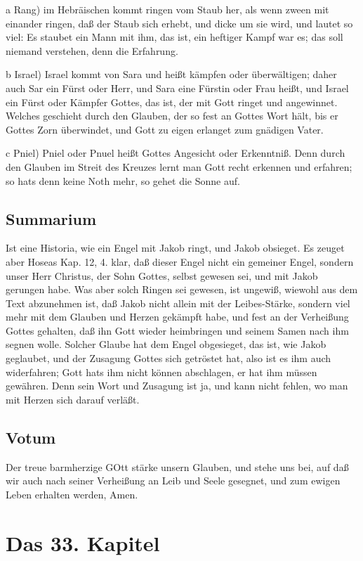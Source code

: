 a Rang) im Hebräischen kommt ringen vom Staub her, als wenn zween mit einander ringen, daß der Staub sich erhebt, und dicke um sie wird, und lautet so viel: Es staubet ein Mann mit ihm, das ist, ein heftiger Kampf war es; das soll niemand verstehen, denn die Erfahrung.

b Israel) Israel kommt von Sara und heißt kämpfen oder überwältigen; daher auch Sar ein Fürst oder Herr, und Sara eine Fürstin oder Frau heißt, und Israel ein Fürst oder Kämpfer Gottes, das ist, der mit Gott ringet und angewinnet. Welches geschieht durch den Glauben, der so fest an Gottes Wort hält, bis er Gottes Zorn überwindet, und Gott zu eigen erlanget zum gnädigen Vater.

c Pniel) Pniel oder Pnuel heißt Gottes Angesicht oder Erkenntniß. Denn durch den Glauben im Streit des Kreuzes lernt man Gott recht erkennen und erfahren; so hats denn keine Noth mehr, so gehet die Sonne auf.

\section{Summarium}

Ist eine Historia, wie ein Engel mit Jakob ringt, und Jakob obsieget. Es zeuget aber Hoseas Kap. 12, 4. klar, daß dieser Engel nicht ein gemeiner Engel, sondern unser Herr Christus, der Sohn Gottes, selbst gewesen sei, und mit Jakob gerungen habe. Was aber solch Ringen sei gewesen, ist ungewiß, wiewohl aus dem Text abzunehmen ist, daß Jakob nicht allein mit der Leibes-Stärke, sondern viel mehr mit dem Glauben und Herzen gekämpft habe, und fest an der Verheißung Gottes gehalten, daß ihn Gott wieder heimbringen und seinem Samen nach ihm segnen wolle. Solcher Glaube hat dem Engel obgesieget, das ist, wie Jakob geglaubet, und der Zusagung Gottes sich getröstet hat, also ist es ihm auch widerfahren; Gott hats ihm nicht können abschlagen, er hat ihm müssen gewähren. Denn sein Wort und Zusagung ist ja, und kann nicht fehlen, wo man mit Herzen sich darauf verläßt.

\section{Votum}

Der treue barmherzige GOtt stärke unsern Glauben, und stehe uns bei, auf daß wir auch nach seiner Verheißung an Leib und Seele gesegnet, und zum ewigen Leben erhalten werden, Amen.

\chapter{Das 33. Kapitel}

